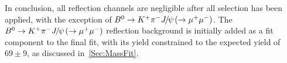 In conclusion, all reflection channels are negligible after all selection has been applied, with the exception of $\Bd\to \Kp\pim\jpsi(\to\mumu)$. The $\Bd\to \Kp\pim\jpsi(\to\mumu)$ reflection background is initially added as a fit component to the final fit, with its yield constrained to the expected yield of $69\pm9$, as discussed in~\autoref{Sec:MassFit}.%







